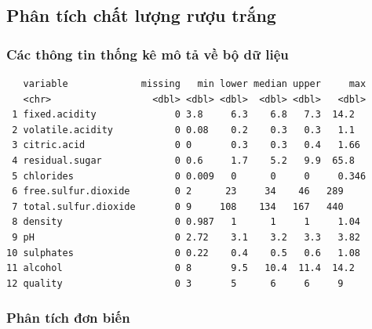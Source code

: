 \subsection{Phân tích chất lượng rượu trắng}

\subsubsection{Các thông tin thống kê mô tả về bộ dữ liệu}

\begin{lstlisting}
   variable             missing   min lower median upper     max
   <chr>                  <dbl> <dbl> <dbl>  <dbl> <dbl>   <dbl>
 1 fixed.acidity              0 3.8     6.3    6.8   7.3  14.2  
 2 volatile.acidity           0 0.08    0.2    0.3   0.3   1.1  
 3 citric.acid                0 0       0.3    0.3   0.4   1.66 
 4 residual.sugar             0 0.6     1.7    5.2   9.9  65.8  
 5 chlorides                  0 0.009   0      0     0     0.346
 6 free.sulfur.dioxide        0 2      23     34    46   289    
 7 total.sulfur.dioxide       0 9     108    134   167   440    
 8 density                    0 0.987   1      1     1     1.04 
 9 pH                         0 2.72    3.1    3.2   3.3   3.82 
10 sulphates                  0 0.22    0.4    0.5   0.6   1.08 
11 alcohol                    0 8       9.5   10.4  11.4  14.2  
12 quality                    0 3       5      6     6     9    
\end{lstlisting}

\subsubsection{Phân tích đơn biến}

